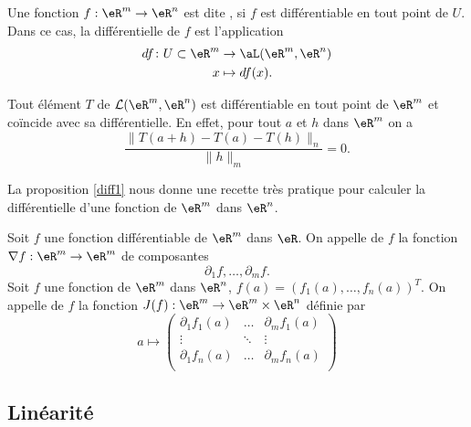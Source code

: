 \begin{definition}
	Une fonction $f:\eR^m\to \eR^n$ est dite , si $f$ est différentiable en tout point de $U$. Dans ce cas, la différentielle de $f$ est l'application
	\begin{equation}
		\begin{aligned}
			df\colon U\subset\eR^m&\to \aL(\eR^m,\eR^n) \\
			x&\mapsto df(x). 
		\end{aligned}
	\end{equation}
\end{definition}

\begin{remark}\label{rk_lin}
  Tout élément $T$ de $\mathcal{L}(\eR^m,\eR^n)$ est différentiable en tout point de $\eR^m$ et coïncide avec sa différentielle. En effet, pour tout $a$ et $h$ dans $\eR^m$  on a 
\[
\frac{\|T(a+h)-T(a)-T(h)\|_n}{\|h\|_m}=0.
\]
\end{remark}
La proposition \ref{diff1} nous donne une recette très pratique pour calculer la différentielle d'une fonction de $\eR^m$ dans $\eR^n$.

 \begin{definition}
	 Soit $f$ une fonction différentiable de $\eR^m$ dans $\eR$. On appelle  de $f$ la fonction $\nabla f : \eR^m\to \eR^m$ de composantes
\[
\partial_{1}f,\ldots,\partial_{m}f. 
\] 
Soit $f$ une fonction de $\eR^m$ dans $\eR^n$, $f(a)=(f_1(a),\ldots,f_n(a))^T$. On appelle  de $f$ la fonction $J(f) : \eR^m\to \eR^m\times\eR^n$ définie par
\begin{equation}
a\mapsto  \begin{pmatrix}
    \partial_{1}f_1(a) &\ldots&\partial_{m}f_1(a)\\
\vdots&\ddots&\vdots\\
\partial_{1}f_n (a)&\ldots&\partial_{m}f_n(a)\\
  \end{pmatrix}
\end{equation}
\end{definition}

\subsection{Linéarité}

